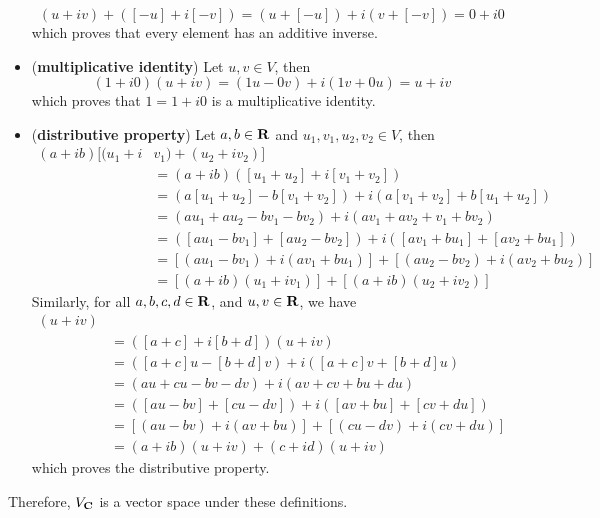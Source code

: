 \begin{solution}
\begin{itemize}
        $$(u+iv) + ([-u] + i[-v]) = (u + [-u]) + i(v + [-v]) = 0 + i0$$
        which proves that every element has an additive inverse.
        \item (\textbf{multiplicative identity}) Let $u,v \in V$, then
        $$(1 + i0)(u +iv) = (1u - 0v) + i(1v + 0u) = u + iv$$
        which proves that $1 = 1 + i0$ is a multiplicative identity.
        \item (\textbf{distributive property}) Let $a,b \in \mathbf{R}$ and $u_1, v_1, u_2, v_2 \in V$, then
        \begin{align*}
            (a+ib)[(u_1 + i&v_1) + (u_2 + iv_2)] \\
            &= (a+ib)([u_1 + u_2] + i[v_1 + v_2]) \\
            &= (a[u_1 + u_2] - b[v_1 + v_2]) + i(a[v_1 + v_2] + b[u_1 + u_2]) \\
            &= (au_1 + au_2 - bv_1 - bv_2) + i(av_1 + av_2 + v_1 + bv_2) \\
            &= ([au_1 - bv_1] + [au_2 - bv_2]) + i([av_1 + bu_1] + [av_2 + bu_1]) \\
            &= [(au_1 - bv_1) + i(av_1 + bu_1)] + [(au_2 - bv_2) + i(av_2 + bu_2)] \\
            &= [(a+ib)(u_1 + iv_1)] + [(a+ib)(u_2 + iv_2)]
        \end{align*}
        Similarly, for all $a,b,c,d \in \mathbf{R}$, and $u,v \in \mathbf{R}$, we have
        \begin{align*}
            [(a+ib) + (c+&id)](u+iv)\\
            &= ([a+c] + i[b+d])(u+iv) \\
            &= ([a+c]u - [b+d]v) + i([a+c]v + [b+d]u) \\
            &= (au + cu -bv -dv) + i(av + cv + bu+du) \\
            &= ([au - bv] + [cu - dv]) + i([av + bu] + [cv + du]) \\
            &= [(au - bv) + i(av + bu)] + [(cu - dv) + i(cv + du)] \\
            &= (a+ib)(u+iv) + (c+id)(u+iv)
        \end{align*}
        which proves the distributive property.
    \end{itemize}
    Therefore, $V_{\mathbf{C}}$ is a vector space under these definitions.
\end{solution}
